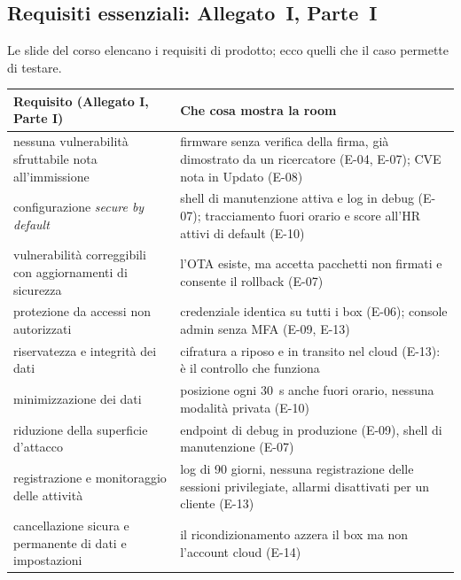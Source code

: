 \subsection{Requisiti essenziali: Allegato~I, Parte~I}
Le slide del corso elencano i requisiti di prodotto; ecco quelli che il caso permette di testare.
\begin{center}
\small
\begin{tabularx}{\linewidth}{p{5.2cm} X}
\toprule
\textbf{Requisito (Allegato I, Parte I)} & \textbf{Che cosa mostra la room} \\ \midrule
nessuna vulnerabilità sfruttabile nota all'immissione & firmware senza verifica della firma, già
  dimostrato da un ricercatore (E-04, E-07); CVE nota in Updato (E-08) \\
configurazione \emph{secure by default} & shell di manutenzione attiva e log in debug (E-07);
  tracciamento fuori orario e score all'HR attivi di default (E-10) \\
vulnerabilità correggibili con aggiornamenti di sicurezza & l'OTA esiste, ma accetta pacchetti non
  firmati e consente il rollback (E-07) \\
protezione da accessi non autorizzati & credenziale identica su tutti i box (E-06); console admin
  senza MFA (E-09, E-13) \\
riservatezza e integrità dei dati & cifratura a riposo e in transito nel cloud (E-13): è il
  controllo che funziona \\
minimizzazione dei dati & posizione ogni 30~s anche fuori orario, nessuna modalità privata (E-10) \\
riduzione della superficie d'attacco & endpoint di debug in produzione (E-09), shell di manutenzione
  (E-07) \\
registrazione e monitoraggio delle attività & log di 90 giorni, nessuna registrazione delle sessioni
  privilegiate, allarmi disattivati per un cliente (E-13) \\
cancellazione sicura e permanente di dati e impostazioni & il ricondizionamento azzera il box ma non
  l'account cloud (E-14) \\
\bottomrule
\end{tabularx}
\end{center}

